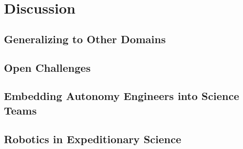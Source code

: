 \chapter{Discussion}

\section{Generalizing to Other Domains}

\section{Open Challenges}

\section{Embedding Autonomy Engineers into Science Teams}

\section{Robotics in Expeditionary Science}